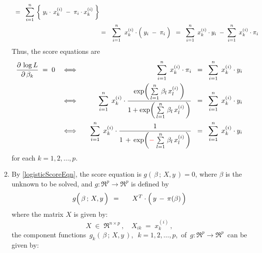 \begin{enumerate}
\begin{eqnarray*}
	\;\; = \;\;
		\overset{n}{\underset{i=1}{\sum}}\,
		\left\{\;
			y_{i}\cdot\,x^{(i)}_{k}
			\; \overset{{\color{white}\vert}}{-} \;
			\pi_{i} \cdot x^{(i)}_{k}
			\;\right\}	
	\\
	&=&
		\overset{n}{\underset{i=1}{\sum}}\;\;
		x^{(i)}_{k}	
		\cdot
		\left(\; y_{i} \; \overset{{\color{white}.}}{-} \; \pi_{i} \;\right)
	\;\; = \;\;
		\overset{n}{\underset{i=1}{\sum}}\;\, x^{(i)}_{k} \cdot y_{i}
		\; - \;
		\overset{n}{\underset{i=1}{\sum}}\;\, x^{(i)}_{k} \cdot \pi_{i}
	\end{eqnarray*}
	Thus, the score equations are
	\begin{eqnarray*}
	\dfrac{\partial\,\log L}{\partial\,\beta_{k}} \;=\; 0
	&\quad\Longleftrightarrow\quad&
		\overset{n}{\underset{i=1}{\sum}}\;\, x^{(i)}_{k} \cdot \pi_{i}
		\;\; = \;\;
		\overset{n}{\underset{i=1}{\sum}}\;\, x^{(i)}_{k} \cdot y_{i}
	\\
	&\quad\Longleftrightarrow\quad&
		\overset{n}{\underset{i=1}{\sum}}\;\, x^{(i)}_{k} \cdot
		\dfrac{
			\exp\!\left(\,\overset{n}{\underset{l=1}{\sum}}\;\beta_{l}\,x^{(i)}_{l}\,\right)
			}{
			1 + \exp\!\left(\,\overset{n}{\underset{l=1}{\sum}}\;\beta_{l}\,x^{(i)}_{l}\,\right)
			}
		\;\; = \;\;
		\overset{n}{\underset{i=1}{\sum}}\;\, x^{(i)}_{k} \cdot y_{i}
	\\
	&\quad\Longleftrightarrow\quad&
		\overset{n}{\underset{i=1}{\sum}}\;\, x^{(i)}_{k} \cdot
		\dfrac{1}{1 \,+\, \exp\!\left({\color{red}-}\;\overset{n}{\underset{l=1}{\sum}}\;\beta_{l}\,x^{(i)}_{l}\,\right)}
		\;\; = \;\;
		\overset{n}{\underset{i=1}{\sum}}\;\, x^{(i)}_{k} \cdot y_{i}
	\end{eqnarray*}
	for each $k = 1,2,\ldots,p$.
\item
	By \eqref{logisticScoreEqn}, the score equation is $g(\,\beta\,;\,X,y\,) = 0$,
	where $\beta$ is the unknown to be solved, and
	$g : \Re^{p} \longrightarrow \Re^{p}$ is defined by
	\begin{eqnarray*}
	g\!\left(\,\overset{{\color{white}.}}{\beta}\,;\,X,y\,\right){\color{white}.}
	& = &
		{\color{white}-}\, X^{T} \cdot \left(\,y \,\overset{{\color{white}.}}{-}\, \pi(\beta)\,\right)
	\end{eqnarray*}
	where the matrix $X$ is given by:
	\begin{equation*}
	X \;\in\; \Re^{n \times p}\,,
	\quad
	X_{ik} \; = \; x^{(i)}_{k}\,,
	\end{equation*}
	the component functions \,$g_{k}(\,\beta\,;\,X,y\,)$,\, \,$k = 1,2,\ldots,p$,\,
	of \,$g : \Re^{p} \longrightarrow \Re^{p}$\, can be given by:

\end{enumerate}
